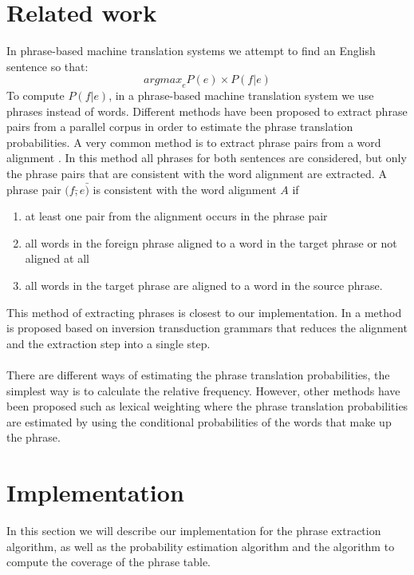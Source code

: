 \documentclass[11pt]{article}
\begin{document}
\section{Related work}
In phrase-based machine translation systems we attempt to find an English sentence so that: 
$$\textit{argmax}_e P(e) \times P(f|e)$$
To compute $P(f|e)$, in a phrase-based machine translation system we use phrases instead of words. Different methods have been proposed to extract phrase pairs from a parallel corpus in order to estimate the phrase translation probabilities. A very common method is to extract phrase pairs from a word alignment \cite{koehn}\cite{theother}. In this method all phrases for both sentences are considered, but only the phrase pairs that are consistent with the word alignment are extracted. A phrase pair $(f\bar, e\bar)$ is consistent with the word alignment $A$ if
\begin{enumerate}
\item at least one pair from the alignment occurs in the phrase pair
\item all words in the foreign phrase aligned to a word in the target phrase or not aligned at all
\item all words in the target phrase are aligned to a word in the source phrase.
\end{enumerate} 
This method of extracting phrases is closest to our implementation. In \cite{super} a method is proposed based on inversion transduction grammars that reduces the alignment and the extraction step into a single step. \\\\
There are different ways of estimating the phrase translation probabilities, the simplest way is to calculate the relative frequency. However, other methods have been proposed such as lexical weighting \cite{lexical} where the phrase translation probabilities are estimated by using the conditional probabilities of the words that make up the phrase.

\section{Implementation}
In this section we will describe our implementation for the phrase extraction algorithm, as well as the probability estimation algorithm and the algorithm to compute the coverage of the phrase table. 
\end{document}
